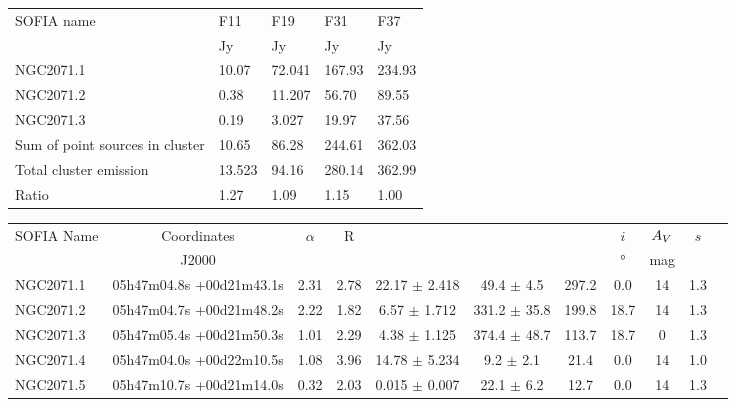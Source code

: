 \renewcommand{\arraystretch}{1.5}
\def\labelitemi{--}
\begin{table}[!h]
\scriptsize
\caption[Sources in NGC2071's dense core]{Sources in the densest region of NGC2071.}
\label{tab:IRAS20050sum}
\vspace{-0.5cm}
\begin{longtable}{lP{2cm}P{2cm}P{2cm}P{2cm}}
\toprule																			
SOFIA name	&	F11	&	F19	&	F31	&	F37	\\
	&	Jy	&	Jy	&	Jy	&	Jy	\\
\midrule									
NGC2071.1	&	10.07	&	72.041	&	167.93	&	234.93	\\
NGC2071.2	&	0.38	&	11.207	&	56.70	&	89.55	\\
NGC2071.3	&	0.19	&	3.027	&	19.97	&	37.56	\\
\midrule									
Sum of point sources in cluster	&	10.65	&	86.28	&	244.61	&	362.03	\\
Total cluster emission	&	13.523	&	94.16	&	280.14	&	362.99	\\
Ratio	&	1.27	&	1.09	&	1.15	&	1.00	\\
\bottomrule					
	\end{longtable} 
\end{table}


\renewcommand{\arraystretch}{1.5}
\def\labelitemi{--}
\begin{table}[!h]
\scriptsize
\caption[Fitted parameters in NGC2071]{Fitted parameters of sources in NGC2071.}
\label{tab:NGC2071params}
\vspace{-0.5cm}
\begin{longtable}{lcccccccccc}
\toprule																							
SOFIA Name	&	Coordinates	&	$\alpha$	&	R	&	\Menv			&	\Ltot			&	\Lbol	&	$i$	&	$A_V$	&	$s$	\\
	&	J2000	&		&		&	\si{\Msun}			&	\si{\Lsun}			&	\si{\Lsun}	&	\si{\degree}	&	mag	&		\\
\midrule																							
NGC2071.1	&	05h47m04.8s +00d21m43.1s	&	2.31	&	2.78	&	22.17	$\pm$	2.418	&	49.4	$\pm$	4.5	&	297.2	&	0.0	&	14	&	1.3	\\
NGC2071.2	&	05h47m04.7s +00d21m48.2s	&	2.22	&	1.82	&	6.57	$\pm$	1.712	&	331.2	$\pm$	35.8	&	199.8	&	18.7	&	14	&	1.3	\\
NGC2071.3	&	05h47m05.4s +00d21m50.3s	&	1.01	&	2.29	&	4.38	$\pm$	1.125	&	374.4	$\pm$	48.7	&	113.7	&	18.7	&	0	&	1.3	\\
NGC2071.4	&	05h47m04.0s +00d22m10.5s	&	1.08	&	3.96	&	14.78	$\pm$	5.234	&	9.2	$\pm$	2.1	&	21.4	&	0.0	&	14	&	1.0	\\
NGC2071.5	&	05h47m10.7s +00d21m14.0s	&	0.32	&	2.03	&	0.015	$\pm$	0.007	&	22.1	$\pm$	6.2	&	12.7	&	0.0	&	14	&	1.3	\\
\bottomrule																							
	\end{longtable} 
\end{table}

